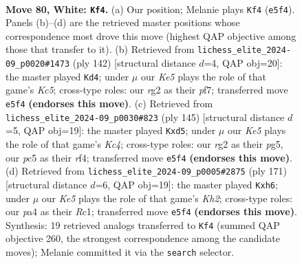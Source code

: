 \documentclass[11pt]{article}
\begin{document}
\clearpage

\begin{figure}[p]\centering
\begin{subfigure}{0.46\textwidth}\centering
\resizebox{\linewidth}{!}{%
\newchessgame
\chessboard[
  setfen={8/4k3/8/2p1K3/p2p4/8/6r1/8 w - - 0 80},
  showmover=false,
  pgfstyle=straightmove, color=movearrow, markmove={e5-f4}
]}
\caption{}
\end{subfigure}\hfill
\begin{subfigure}{0.46\textwidth}\centering
\resizebox{\linewidth}{!}{%
\newchessgame
\chessboard[
  setfen={8/p4p2/8/2K5/kp6/8/8/8 w - - 0 72},
  showmover=false,
  pgfstyle=straightmove, color=movearrow, markmove={c5-d4}
]}
\caption{}
\end{subfigure}
\\[4pt]
\begin{subfigure}{0.46\textwidth}\centering
\resizebox{\linewidth}{!}{%
\newchessgame
\chessboard[
  setfen={8/5P2/8/2kP2P1/5R2/3K4/8/8 b - - 2 73},
  showmover=false,
  pgfstyle=straightmove, color=movearrow, markmove={c5-d5}
]}
\caption{}
\end{subfigure}\hfill
\begin{subfigure}{0.46\textwidth}\centering
\resizebox{\linewidth}{!}{%
\newchessgame
\chessboard[
  setfen={8/5K1k/7P/5P2/8/8/4R3/2r5 b - - 20 86},
  showmover=false,
  pgfstyle=straightmove, color=movearrow, markmove={h7-h6}
]}
\caption{}
\end{subfigure}
\caption{\textbf{Move 80, White: \texttt{Kf4}.} (a) Our position; Melanie plays \texttt{Kf4} (\texttt{e5f4}). Panels (b)--(d) are the retrieved master positions whose correspondence most drove this move (highest QAP objective among those that transfer to it). (b) Retrieved from \texttt{lichess\_elite\_2024-09\_p0020\#1473} (ply 142) [structural distance $d$=4, QAP obj=20]: the master played \texttt{Kd4}; under $\mu$ our \emph{Ke5} plays the role of that game's \emph{Kc5}; cross-type roles: our \emph{r}g2 as their \emph{p}f7; transferred move \texttt{e5f4} \textbf{(endorses this move)}. (c) Retrieved from \texttt{lichess\_elite\_2024-09\_p0030\#823} (ply 145) [structural distance $d$=5, QAP obj=19]: the master played \texttt{Kxd5}; under $\mu$ our \emph{Ke5} plays the role of that game's \emph{Kc4}; cross-type roles: our \emph{r}g2 as their \emph{p}g5, our \emph{p}c5 as their \emph{r}f4; transferred move \texttt{e5f4} \textbf{(endorses this move)}. (d) Retrieved from \texttt{lichess\_elite\_2024-09\_p0005\#2875} (ply 171) [structural distance $d$=6, QAP obj=19]: the master played \texttt{Kxh6}; under $\mu$ our \emph{Ke5} plays the role of that game's \emph{Kh2}; cross-type roles: our \emph{p}a4 as their \emph{R}c1; transferred move \texttt{e5f4} \textbf{(endorses this move)}. Synthesis: 19 retrieved analogs transferred to \texttt{Kf4} (summed QAP objective 260, the strongest correspondence among the candidate moves); Melanie committed it via the \texttt{search} selector.}
\label{fig:thought-m158}
\end{figure}
\end{document}
